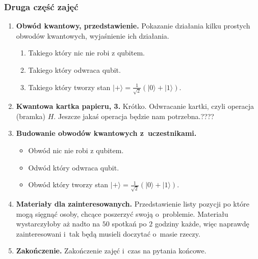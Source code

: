 \documentclass[10pt,t]{beamer}
\begin{document}
\begin{frame}
  \frametitle{Druga część zajęć}


  \begin{enumerate}
    \RaggedRight

  \item \textbf{Obwód kwantowy, przedstawienie.} Pokazanie działania
    kilku prostych obwodów kwantowych, wyjaśnienie ich działania.

    \begin{enumerate}
      \RaggedRight

    \item Takiego który nic nie robi z qubitem.

    \item Takiego który odwraca qubit.

    \item Takiego który tworzy stan
      $| + \rangle = \frac{ 1 }{ \sqrt{ 2 } } ( | 0 \rangle + | 1 \rangle )$.

    \end{enumerate}

  \item \textbf{Kwantowa kartka papieru, 3.} Krótko. Odwracanie kartki,
    czyli operacja (bramka) $H$. Jeszcze jakaś operacja będzie nam
      potrzebna.????

    \item \textbf{Budowanie obwodów kwantowych z~uczestnikami.}

      \begin{itemize}
        \RaggedRight

      \item Obwód nic nie robi z qubitem.

      \item Odwód który odwraca qubit.

      \item Obwód który tworzy stan
        $| + \rangle = \frac{ 1 }{ \sqrt{ 2 } } ( | 0 \rangle + | 1 \rangle )$.

      \end{itemize}

    \item \textbf{Materiały dla zainteresowanych.} Przedstawienie listy
      pozycji po które mogą sięgnąć osoby, chcące poszerzyć swoją
      o~problemie. Materiału wystarczyłoby aż nadto na $50$ spotkań po $2$
      godziny każde, więc naprawdę zainteresowani i~tak będą musieli
      doczytać o~masie rzeczy.

    \item \textbf{Zakończenie.} Zakończenie zajęć i~czas na pytania
      końcowe.

    \end{enumerate}

\end{frame}
\end{document}
